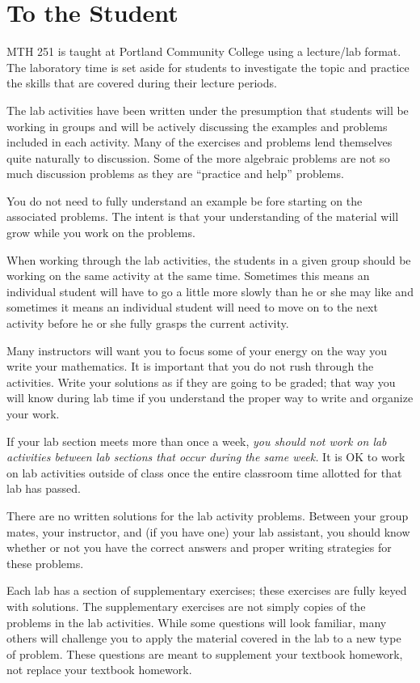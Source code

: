 \documentclass[12pt,]{book}
\theoremstyle{plain}
\theoremstyle{definition}
\numberwithin{equation}{section}
\begin{document}
\chapter*{To the Student}\label{to-the-student}
MTH 251 is taught at Portland Community College using a lecture/lab format. The laboratory time is set aside for students to investigate the topic and practice the skills that are covered during their lecture periods.%
\par
The lab activities have been written under the presumption that students will be working in groups and will be actively discussing the examples and problems included in each activity. Many of the exercises and problems lend themselves quite naturally to discussion. Some of the more algebraic problems are not so much discussion problems as they are ``practice and help'' problems.%
\par
You do not need to fully understand an example be fore starting on the associated problems. The intent is that your understanding of the material will grow while you work on the problems.%
\par
When working through the lab activities, the students in a given group should be working on the same activity at the same time. Sometimes this means an individual student will have to go a little more slowly than he or she may like and sometimes it means an individual student will need to move on to the next activity before he or she fully grasps the current activity.%
\par
Many instructors will want you to focus some of your energy on the way you write your mathematics. It is important that you do not rush through the activities. Write your solutions as if they are going to be graded; that way you will know during lab time if you understand the proper way to write and organize your work.%
\par
If your lab section meets more than once a week, \emph{you should not work on lab activities between lab sections that occur during the same week.} It is OK to work on lab activities outside of class once the entire classroom time allotted for that lab has passed.%
\par
There are no written solutions for the lab activity problems. Between your group mates, your instructor, and (if you have one) your lab assistant, you should know whether or not you have the correct answers and proper writing strategies for these problems.%
\par
Each lab has a section of supplementary exercises; these exercises are fully keyed with solutions. The supplementary exercises are not simply copies of the problems in the lab activities. While some questions will look familiar, many others will challenge you to apply the material covered in the lab to a new type of problem. These questions are meant to supplement your textbook homework, not replace your textbook homework.%
\end{document}
